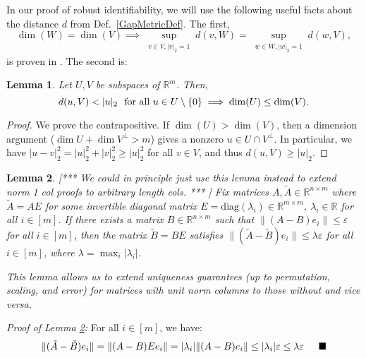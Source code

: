 \documentclass[journal, onecolumn]{IEEEtran}
\newtheorem{lemma}{Lemma}
\begin{document}
In our proof of robust identifiability, we will use the following useful facts about the distance $d$ from Def.~\ref{GapMetricDef}. The first, 
\begin{equation}\label{SubspaceMetricSameDim}
\dim(W) = \dim(V) \implies \sup_{\substack{v \in V, |v|_2 = 1}}  d(v,W)  = \sup_{\substack{w \in W, |w|_2 = 1}} d(w,V),
\end{equation}
is proven in \cite[Lemma 3.3]{Morris10}. The second is:
\begin{lemma}\label{MinDimLemma}
Let $U, V$ be subspaces of $\mathbb{R}^{m}$. Then,
\begin{equation}\label{MinDim}
d(u,V) < |u|_2 \ \ \text{\rm for all } u \in U \setminus{\{0\}} \implies \dim(U) \leq \dim(V).
\end{equation}
\end{lemma}

\begin{proof}
We prove the contrapositive.  If $\dim(U) > \dim(V)$, then a dimension argument ($\dim U + \dim V^\perp > m$) gives a nonzero $u \in U \cap V^\perp$.  In particular, we have $|u - v|_2^2 = |u|_2^2 + |v|_2^2 \geq |u|_2^2$ for all $v \in V$, and thus $d(u,V) \geq |u|_2$.
\end{proof}

\begin{lemma}\label{NormalizedDictionaryLemma}
[*** We could in principle just use this lemma instead to extend norm 1 col proofs to arbitrary length cols. *** ]
Fix matrices $A, \tilde{A} \in \mathbb{R}^{n \times m}$ where $\tilde{A} = AE$ for some invertible diagonal matrix $E = \text{diag}(\lambda_i) \in \mathbb{R}^{m \times m}$, $\lambda_i \in \mathbb{R}$ for all $i \in [m]$. If there exists a matrix $B \in \mathbb{R}^{n \times m}$ such that $\|(A - B)e_i\| \leq \varepsilon$ for all $i \in [m]$, then the matrix $\tilde{B} = BE$ satisfies $\|(\tilde{A} - \tilde{B})e_i\| \leq \lambda \varepsilon$ for all $i \in [m]$, where $\lambda = \max_i |\lambda_i|$.

This lemma allows us to extend uniqueness guarantees (up to permutation, scaling, and error) for matrices with unit norm columns to those without and vice versa. 
\end{lemma}

\emph{Proof of Lemma \ref{NormalizedDictionaryLemma}:} For all $i \in [m]$, we have:
\begin{align*}
\|(\tilde{A} - \tilde{B})e_i\| = \|(A-B)Ee_i\| = |\lambda_i| \|(A-B)e_i\| \leq |\lambda_i| \varepsilon \leq \lambda \varepsilon 
\indent \blacksquare
\end{align*}
\end{document}
